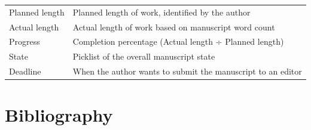 \documentclass[11pt,openany]{book}
\begin{document}
\begin{longtable}[]{@{}ll@{}}
\begin{minipage}[t]{0.21\columnwidth}\raggedright
Planned length\strut
\end{minipage} & \begin{minipage}[t]{0.73\columnwidth}\raggedright
Planned length of work, identified by the author\strut
\end{minipage}\tabularnewline
\begin{minipage}[t]{0.21\columnwidth}\raggedright
Actual length\strut
\end{minipage} & \begin{minipage}[t]{0.73\columnwidth}\raggedright
Actual length of work based on manuscript word count\strut
\end{minipage}\tabularnewline
\begin{minipage}[t]{0.21\columnwidth}\raggedright
Progress\strut
\end{minipage} & \begin{minipage}[t]{0.73\columnwidth}\raggedright
Completion percentage (Actual length ÷ Planned length)\strut
\end{minipage}\tabularnewline
\begin{minipage}[t]{0.21\columnwidth}\raggedright
State\strut
\end{minipage} & \begin{minipage}[t]{0.73\columnwidth}\raggedright
Picklist of the overall manuscript state\strut
\end{minipage}\tabularnewline
\begin{minipage}[t]{0.21\columnwidth}\raggedright
Deadline\strut
\end{minipage} & \begin{minipage}[t]{0.73\columnwidth}\raggedright
When the author wants to submit the manuscript to an editor\strut
\end{minipage}\tabularnewline
\bottomrule
\end{longtable}

\newpage{}

\hypertarget{bibliography}{%
\section*{Bibliography}\label{bibliography}}
\end{document}

